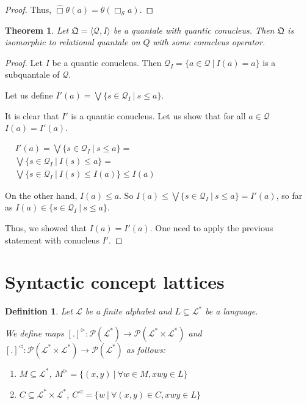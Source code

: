 \documentclass[a4paper]{article}
\theoremstyle{defin}
\newtheorem{defin}{Definition}
\theoremstyle{theorem}
\newtheorem{theorem}{Theorem}
\theoremstyle{prop}
\theoremstyle{lemma}
\theoremstyle{ex}
\theoremstyle{col}
\begin{document}
\begin{proof}
Thus, $\hat{\Box} \theta(a) = \theta(\Box_{\mathcal{S}} a)$.

\end{proof}

\begin{theorem}
  Let $\mathfrak{Q} = \langle \mathcal{Q}, I \rangle$ be a quantale with
  quantic conucleus. Then $\mathfrak{Q}$ is isomorphic to relational quantale on $Q$ with some conucleus operator.
\end{theorem}

\begin{proof}
  Let $I$ be a quantic conucleus. Then $\mathcal{Q}_{I} = \{ a \in \mathcal{Q} \: | \: I(a) = a \}$ is a subquantale of $\mathcal{Q}$.

  Let us define $I'(a) = \bigvee \{ s \in \mathcal{Q}_{I} \: | \: s \leq a \}$.

  It is clear that $I'$ is a quantic conucleus. Let us show that for all
  $a \in \mathcal{Q}$ $I(a) = I'(a)$.

  $\begin{array}{lll}
  & I'(a) = \bigvee \{ s \in \mathcal{Q}_{I} \: | \: s \leq a \} = & \\
  & \bigvee \{ s \in \mathcal{Q}_{I} \: | \: I(s) \leq a \} = & \\
  & \bigvee \{ s \in \mathcal{Q}_{I} \: | \: I(s) \leq I(a) \} \leq I(a)&
  \end{array}$

  On the other hand, $I(a) \leq a$. So $I(a) \leq \bigvee \{ s \in \mathcal{Q}_{I} \: | \: s \leq a \} = I'(a)$, so far as $I(a) \in \{ s \in \mathcal{Q}_{I} \: | \: s \leq a \}$.

  Thus, we showed that $I(a) = I'(a)$. One need to apply the previous statement with conucleus $I'$.
\end{proof}

\section{Syntactic concept lattices}

\begin{defin}
  Let $\mathcal{L}$ be a finite alphabet and $L \subseteq \mathcal{L}^{*}$ be a language.

  We define maps $[.]^{\triangleright} : \mathcal{P}(\mathcal{L}^{*}) \to \mathcal{P}(\mathcal{L}^{*} \times \mathcal{L}^{*})$
  and $[.]^{\triangleleft} : \mathcal{P}(\mathcal{L}^{*} \times \mathcal{L}^{*}) \to \mathcal{P}(\mathcal{L}^{*})$ as follows:

  \begin{enumerate}
    \item $M \subseteq \mathcal{L}^{*}$, $M^{\triangleright} = \{ (x, y) \: | \: \forall w \in M, x w y \in L \}$
    \item $C \subseteq \mathcal{L}^{*} \times \mathcal{L}^{*}$, $C^{\triangleleft} = \{ w \: | \: \forall (x, y) \in C, x w y
    \in L\}$
  \end{enumerate}
\end{defin}
\end{document}
